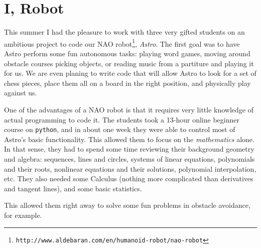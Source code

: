 \documentclass[twocolumn]{amsart}
\begin{document}
\section{I, Robot}

This summer I had the pleasure to work with three very gifted students on an ambitious project to code our NAO robot\footnote{\tt http://www.aldebaran.com/en/humanoid-robot/nao-robot}, \emph{Astro}.  The first goal was to have Astro perform some fun autonomous tasks: playing word games, moving around obstacle courses picking objects, or reading music from a partiture and playing it for us.  We are even planing to write code that will allow Astro to look for a set of chess pieces, place them all on a board in the right position, and physically play against us.

One of the advantages of a NAO robot is that it requires very little knowledge of actual programming to code it.  The students took a 13-hour online beginner course on {\tt python}, and in about one week they were able to control most of Astro's basic functionality.  This allowed them to focus on the \emph{mathematics} alone.   In that sense, they had to spend some time reviewing their background geometry and algebra: sequences, lines and circles, systems of linear equations, polynomials and their roots, nonlinear equations and their solutions, polynomial interpolation, etc.  They also needed some Calculus (nothing more complicated than derivatives and tangent lines), and some basic statistics.

This allowed them right away to solve some fun problems in obstacle avoidance, for example.  
\end{document}
